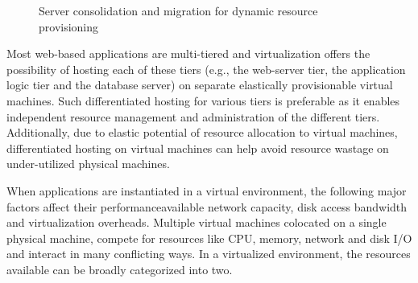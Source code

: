 \begin{figure}[t]
\begin{center}
\vspace{-0.1in}
\caption{Server consolidation and migration for dynamic resource provisioning}
\label{consolidation-migration}
\end{center}
\end{figure}



Most web-based applications are multi-tiered and 
virtualization
offers the possibility of hosting each of these tiers (e.g., the 
web-server tier,
the application logic tier and the database server) on separate
elastically provisionable virtual machines. Such differentiated hosting
for various tiers is preferable %
as it enables independent resource management and
administration of the different tiers. Additionally, due to
elastic potential of resource allocation to virtual machines,
differentiated hosting on virtual machines can help avoid resource
wastage on under-utilized physical machines.


When applications are instantiated in a virtual
environment, the following major factors affect their 
performance\textemdash{}available network capacity, disk access bandwidth
and virtualization overheads. 
Multiple virtual machines 
colocated on a single physical machine,
compete for resources like CPU, memory, network and disk I/O
and interact in many conflicting ways. 
In a virtualized environment, the resources available can 
be broadly categorized into two.

